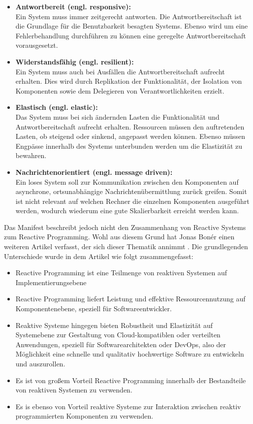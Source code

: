 \begin{itemize}
	\item \textbf{Antwortbereit (engl. responsive):}\\ Ein System muss immer zeitgerecht antworten. Die Antwortbereitschaft ist die Grundlage für die Benutzbarkeit besagten Systems. Ebenso wird um eine Fehlerbehandlung durchführen zu können eine geregelte Antwortbereitschaft vorausgesetzt.
	\item \textbf{Widerstandsfähig (engl. resilient):}\\ Ein System muss auch bei Ausfällen die Antwortbereitschaft aufrecht erhalten. Dies wird durch Replikation der Funktionalität, der Isolation von Komponenten sowie dem Delegieren von Verantwortlichkeiten erzielt. 
	\item \textbf{Elastisch (engl. elastic):}\\ Das System muss bei sich ändernden Lasten die Funktionalität und Antwortbereitschaft aufrecht erhalten. Ressourcen müssen den auftretenden Lasten, ob steigend oder sinkend, angepasst werden können. Ebenso müssen Engpässe innerhalb des Systems unterbunden werden um die Elastizität zu bewahren.
	\item \textbf{Nachrichtenorientiert (engl. message driven):}\\ Ein loses System soll zur Kommunikation zwischen den Komponenten auf asynchrone, ortsunabhängige Nachrichtenübermittlung zurück greifen. Somit ist nicht relevant auf welchen Rechner die einzelnen Komponenten ausgeführt werden, wodurch wiederum eine gute Skalierbarkeit erreicht werden kann.
\end{itemize}
Das Manifest beschreibt jedoch nicht den Zusammenhang von Reactive Systems zum Reactive Programming. Wohl aus diesem Grund hat Jonas Bonér einen weiteren Artikel verfasst, der sich dieser Thematik annimmt \cite{Boner.}. Die grundlegenden Unterschiede wurde in dem Artikel wie folgt zusammengefasst:
\begin{itemize}
	\item Reactive Programming ist eine Teilmenge von reaktiven Systemen auf Implementierungsebene
	\item Reactive Programming liefert Leistung und effektive Ressourcennutzung auf Komponentenebene, speziell für Softwareentwickler.
	\item Reaktive Systeme hingegen bieten Robustheit und Elastizität auf Systemebene zur Gestaltung von Cloud-kompatiblen oder verteilten Anwendungen, speziell für Softwarearchitekten oder DevOps, also der Möglichkeit eine schnelle und qualitativ hochwertige Software zu entwickeln und auszurollen.
	\item Es ist von großem Vorteil Reactive Programming innerhalb der Bestandteile von reaktiven Systemen zu verwenden.
	\item Es is ebenso von Vorteil reaktive Systeme zur Interaktion zwischen reaktiv programmierten Komponenten zu verwenden.
\end{itemize}
